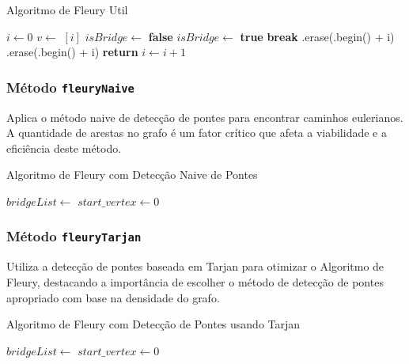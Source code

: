 \documentclass[12pt]{article}
\begin{document}
\begin{algorithm}[H]
\caption{Algoritmo de Fleury Util}
\begin{algorithmic}[1]
    \State $i \gets 0$
        \State $v \gets$ $[i]$
        \State $isBridge \gets$ \textbf{false}
                \State $isBridge \gets$ \textbf{true}
                \State \textbf{break}
            \EndIf
        \EndFor
            \State {}.erase(.begin() + i)
            \State {}.erase(.begin() + i)
            \State {}
            \State \textbf{return} 
        \Else
            \State $i \gets i + 1$
        \EndIf
    \EndWhile
\EndFunction
\end{algorithmic}
\end{algorithm}
\subsubsection{Método \texttt{fleuryNaive}}

Aplica o método naive de detecção de pontes para encontrar caminhos eulerianos. A quantidade de arestas no grafo é um fator crítico que afeta a viabilidade e a eficiência deste método.

\begin{algorithm}[H]
\caption{Algoritmo de Fleury com Detecção Naive de Pontes}
\begin{algorithmic}[1]
    \State $bridgeList \gets$ 
    \State $start\_vertex \gets 0$ 
    \State {}
\EndFunction
\end{algorithmic}
\end{algorithm}

\subsubsection{Método \texttt{fleuryTarjan}}

 Utiliza a detecção de pontes baseada em Tarjan para otimizar o Algoritmo de Fleury, destacando a importância de escolher o método de detecção de pontes apropriado com base na densidade do grafo.
\begin{algorithm}[H]
\caption{Algoritmo de Fleury com Detecção de Pontes usando Tarjan}
\begin{algorithmic}[1]
    \State $bridgeList \gets$ 
    \State $start\_vertex \gets 0$ 
    \State {}
\EndFunction
\end{algorithmic}
\end{algorithm}
\end{document}
